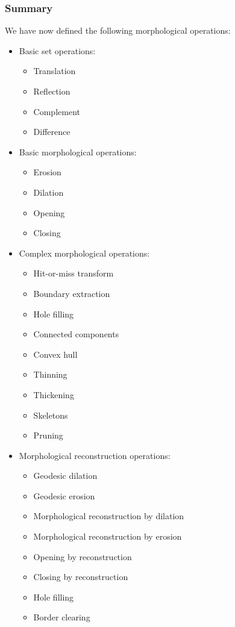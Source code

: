 \subsubsection{Summary}
We have now defined the following morphological operations:
\begin{itemize}
    \item Basic set operations:
    \begin{itemize}
        \item Translation
        \item Reflection
        \item Complement
        \item Difference
    \end{itemize}
    \item Basic morphological operations:
    \begin{itemize}
        \item Erosion
        \item Dilation
        \item Opening
        \item Closing
    \end{itemize}
    \item Complex morphological operations:
    \begin{itemize}
        \item Hit-or-miss transform
        \item Boundary extraction
        \item Hole filling
        \item Connected components
        \item Convex hull
        \item Thinning
        \item Thickening
        \item Skeletons
        \item Pruning
    \end{itemize}
    \item Morphological reconstruction operations:
    \begin{itemize}
        \item Geodesic dilation
        \item Geodesic erosion
        \item Morphological reconstruction by dilation
        \item Morphological reconstruction by erosion
        \item Opening by reconstruction
        \item Closing by reconstruction
        \item Hole filling
        \item Border clearing
    \end{itemize}
\end{itemize}

